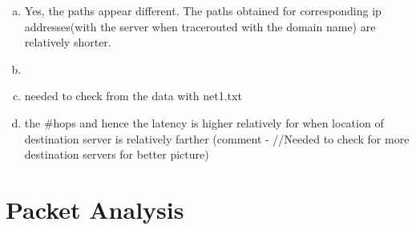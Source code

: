 \documentclass{article}
\begin{document}
\begin{enumerate}[a)]
\begin{itemize}
        \end{itemize}{}
        \item Yes, the paths appear different. The paths obtained for corresponding ip addresses(with the server when tracerouted with the domain name) are relatively shorter.
        \item 
        \item needed to check from the data with net1.txt
        \item the \#hops and hence the latency is higher relatively for when location of destination server is relatively farther
        (comment - //Needed to check for more destination servers for better picture)
    \end{enumerate}{}
    \clearpage
\section{Packet Analysis}
\end{document}
